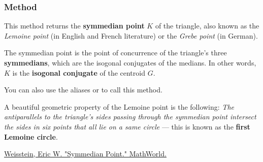 \subsubsection{Method }
\label{ssub:method_triangle_lemoine_point}

This method returns the \textbf{symmedian point} $K$ of the triangle, also known as the \emph{Lemoine point} (in English and French literature) or the \emph{Grebe point} (in German).

\medskip

The symmedian point is the point of concurrence of the triangle’s three \textbf{symmedians}, which are the isogonal conjugates of the medians. In other words, $K$ is the \textbf{isogonal conjugate} of the centroid $G$.

\medskip

You can also use the aliases  or  to call this method.

\medskip

A beautiful geometric property of the Lemoine point is the following:
\textit{The antiparallels to the triangle’s sides passing through the symmedian point intersect the sides in six points that all lie on a same circle} — this is known as the \textbf{first Lemoine circle}.
\begin{flushright}
\small
\href{https://mathworld.wolfram.com/SymmedianPoint.html}{Weisstein, Eric W. "Symmedian Point." MathWorld.}
\end{flushright}
\label{sub:antiparallel_through_lemoine_point}

\vspace{1em}
\begin{minipage}{.5\textwidth}
\begin{center}
\end{center}
\end{minipage}
\begin{minipage}{.5\textwidth}
\begin{tkzexample}
\end{tkzexample}
\end{minipage}

